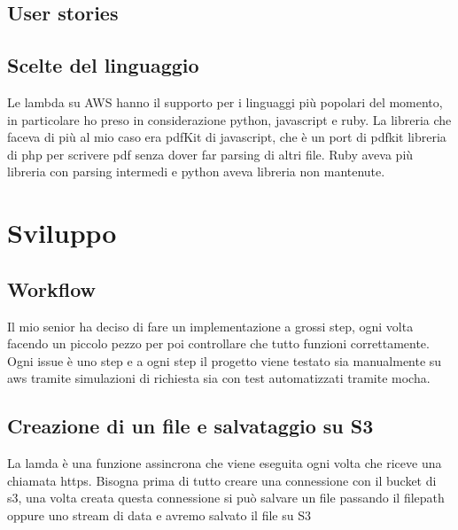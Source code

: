 \documentclass[12pt]{article}
\begin{document}
\subsection{User stories}
\subsection{Scelte del linguaggio}
Le lambda su AWS hanno il supporto per i linguaggi più popolari del momento, in
particolare ho preso in considerazione python, javascript e ruby. La libreria
che faceva di più al mio caso era pdfKit di javascript, che è un port di pdfkit
libreria di php per scrivere pdf senza dover far parsing di altri file.
Ruby aveva più libreria con parsing intermedi e python aveva libreria non mantenute.


\section{Sviluppo}
\subsection{Workflow}
Il mio senior ha deciso di fare un implementazione a grossi step, ogni volta
facendo un piccolo pezzo per poi controllare che tutto funzioni correttamente.
Ogni issue è uno step e a ogni step il progetto viene testato sia manualmente su
aws tramite simulazioni di richiesta sia con test automatizzati tramite mocha.

\subsection{Creazione di un file e salvataggio su S3}
La lamda è una funzione assincrona che viene eseguita ogni volta che riceve una
chiamata https. Bisogna prima di tutto creare una connessione con il bucket di s3,
una volta creata questa connessione si può salvare un file passando il filepath
oppure uno stream di data e avremo salvato il file su S3
\end{document}
